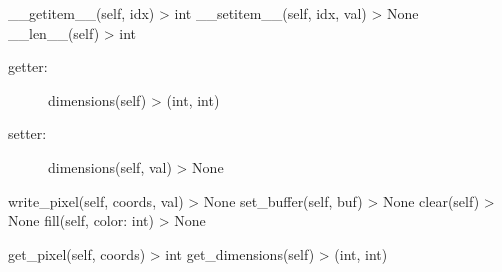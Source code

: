 \documentclass[letterpaper,10pt,english]{sphinxmanual}
\begin{document}
\begin{fulllineitems}
\begin{fulllineitems}
\end{fulllineitems}



\begin{fulllineitems}

\pysigstartsignatures
{}
\pysigstopsignatures
\sphinxAtStartPar
\_\_getitem\_\_(self, idx) \sphinxhyphen{}\textgreater{} int
\_\_setitem\_\_(self, idx, val) \sphinxhyphen{}\textgreater{} None
\_\_len\_\_(self) \sphinxhyphen{}\textgreater{} int

\end{fulllineitems}



\begin{fulllineitems}

\pysigstartsignatures
{}
\pysigstopsignatures\begin{description}
\item[{getter:}] \leavevmode
\sphinxAtStartPar
dimensions(self) \sphinxhyphen{}\textgreater{} (int, int)

\item[{setter:}] \leavevmode
\sphinxAtStartPar
dimensions(self, val) \sphinxhyphen{}\textgreater{} None

\end{description}

\end{fulllineitems}



\begin{fulllineitems}

\pysigstartsignatures
{}
\pysigstopsignatures
\sphinxAtStartPar
write\_pixel(self, coords, val) \sphinxhyphen{}\textgreater{} None
set\_buffer(self, buf) \sphinxhyphen{}\textgreater{} None
clear(self) \sphinxhyphen{}\textgreater{} None
fill(self, color: int) \sphinxhyphen{}\textgreater{} None

\end{fulllineitems}



\begin{fulllineitems}

\pysigstartsignatures
{}
\pysigstopsignatures
\sphinxAtStartPar
get\_pixel(self, coords) \sphinxhyphen{}\textgreater{} int
get\_dimensions(self) \sphinxhyphen{}\textgreater{} (int, int)


\end{fulllineitems}
\end{fulllineitems}
\end{document}
